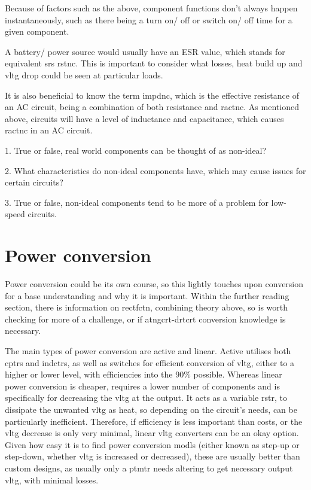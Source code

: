 \documentclass[a4paper,11pt]{report}
\newcommand{\Quiz}[1] %
{
\par\noindent %
\phantomsection %
\todo[inline, color=blue!30]{\textbf{#1}} %
\vspace{1em} %
}
\begin{document}
Because of factors such as the above, component functions don't always happen instantaneously, such as there being a turn on/ off or switch on/ off time for a given component.

A battery/ power source would usually have an ESR value, which stands for equivalent \gls{srs} \gls{rstnc}. This is important to consider what losses, heat build up and \gls{vltg} drop could be seen at particular loads.

It is also beneficial to know the term \gls{impdnc}, which is the effective resistance of an AC circuit, being a combination of both resistance and \gls{ractnc}. As mentioned above, circuits will have a level of inductance and capacitance, which causes \gls{ractnc} in an AC circuit.

\Quiz{Quiz}

1. True or false, real world components can be thought of as non-ideal?

2. What characteristics do non-ideal components have, which may cause issues for certain circuits?

3. True or false, non-ideal components tend to be more of a problem for low-speed circuits.

\pagebreak

\section{Power conversion}

Power conversion could be its own course, so this lightly touches upon conversion for a base understanding and why it is important. Within the further reading section, there is information on \gls{rectfctn}, combining theory above, so is worth checking for more of a challenge, or if \gls{atngcrt}-\gls{drtcrt} conversion knowledge is necessary.

The main types of power conversion are active and linear. Active utilises both \gls{cptr}s and \gls{indctr}s, as well as switches for efficient conversion of \gls{vltg}, either to a higher or lower level, with efficiencies into the 90\% possible. Whereas linear power conversion is cheaper, requires a lower number of components and is specifically for decreasing the \gls{vltg} at the output. It acts as a variable \gls{rstr}, to dissipate the unwanted \gls{vltg} as heat, so depending on the circuit's needs, can be particularly inefficient. Therefore, if efficiency is less important than costs, or the \gls{vltg} decrease is only very minimal, linear \gls{vltg} converters can be an okay option. Given how easy it is to find power conversion \gls{modl}s (either known as step-up or step-down, whether \gls{vltg} is increased or decreased), these are usually better than custom designs, as usually only a \gls{ptmtr} needs altering to get necessary output \gls{vltg}, with minimal losses.
\end{document}
